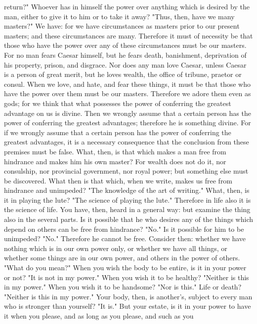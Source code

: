 \documentclass[a4paper]{article}
\begin{document}
return?" Whoever has in himself the power over anything which is desired by the
man, either to give it to him or to take it away? "Thus, then, have we many
masters?" We have: for we have circumstances as masters prior to our present
masters; and these circumstances are many. Therefore it must of necessity be
that those who have the power over any of these circumstances must be our
masters. For no man fears Caesar himself, but he fears death, banishment,
deprivation of his property, prison, and disgrace. Nor does any man love
Caesar, unless Caesar is a person of great merit, but he loves wealth, the
office of tribune, praetor or consul. When we love, and hate, and fear these
things, it must be that those who have the power over them must be our masters.
Therefore we adore them even as gods; for we think that what possesses the
power of conferring the greatest advantage on us is divine. Then we wrongly
assume that a certain person has the power of conferring the greatest
advantages; therefore he is something divine. For if we wrongly assume that a
certain person has the power of conferring the greatest advantages, it is a
necessary consequence that the conclusion from these premises must be false.
    What, then, is that which makes a man free from hindrance and makes him his
own master? For wealth does not do it, nor consulship, nor provincial
government, nor royal power; but something else must be discovered. What then
is that which, when we write, makes us free from hindrance and unimpeded? "The
knowledge of the art of writing." What, then, is it in playing the lute? "The
science of playing the lute." Therefore in life also it is the science of life.
You have, then, heard in a general way: but examine the thing also in the
several parts. Is it possible that he who desires any of the things which
depend on others can be free from hindrance? "No." Is it possible for him to be
unimpeded? "No." Therefore he cannot be free. Consider then: whether we have
nothing which is in our own power only, or whether we have all things, or
whether some things are in our own power, and others in the power of others.
"What do you mean?" When you wish the body to be entire, is it in your power or
not? "It is not in my power." When you wish it to be healthy? "Neither is this
in my power." When you wish it to be handsome? "Nor is this." Life or death?
"Neither is this in my power." Your body, then, is another's, subject to every
man who is stronger than yourself? "It is." But your estate, is it in your
power to have it when you please, and as long as you please, and such as you
\end{document}

